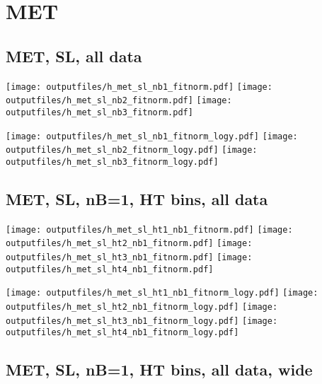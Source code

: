 \documentclass[11pt]{article}
\begin{document}
  \pagebreak
  \clearpage
  \tableofcontents
  \clearpage





    \section{MET}
     \subsection{ MET, SL, all data}

    \noindent
     \texttt{[image: outputfiles/h\_met\_sl\_nb1\_fitnorm.pdf]}
     \texttt{[image: outputfiles/h\_met\_sl\_nb2\_fitnorm.pdf]}
     \texttt{[image: outputfiles/h\_met\_sl\_nb3\_fitnorm.pdf]}

    \noindent
     \texttt{[image: outputfiles/h\_met\_sl\_nb1\_fitnorm\_logy.pdf]}
     \texttt{[image: outputfiles/h\_met\_sl\_nb2\_fitnorm\_logy.pdf]}
     \texttt{[image: outputfiles/h\_met\_sl\_nb3\_fitnorm\_logy.pdf]}


     \subsection{ MET, SL, nB=1, HT bins, all data}


    \noindent
     \texttt{[image: outputfiles/h\_met\_sl\_ht1\_nb1\_fitnorm.pdf]}
     \texttt{[image: outputfiles/h\_met\_sl\_ht2\_nb1\_fitnorm.pdf]}
     \texttt{[image: outputfiles/h\_met\_sl\_ht3\_nb1\_fitnorm.pdf]}
     \texttt{[image: outputfiles/h\_met\_sl\_ht4\_nb1\_fitnorm.pdf]}

    \noindent
     \texttt{[image: outputfiles/h\_met\_sl\_ht1\_nb1\_fitnorm\_logy.pdf]}
     \texttt{[image: outputfiles/h\_met\_sl\_ht2\_nb1\_fitnorm\_logy.pdf]}
     \texttt{[image: outputfiles/h\_met\_sl\_ht3\_nb1\_fitnorm\_logy.pdf]}
     \texttt{[image: outputfiles/h\_met\_sl\_ht4\_nb1\_fitnorm\_logy.pdf]}



     \clearpage
     \subsection{ MET, SL, nB=1, HT bins, all data, wide}
\end{document}
